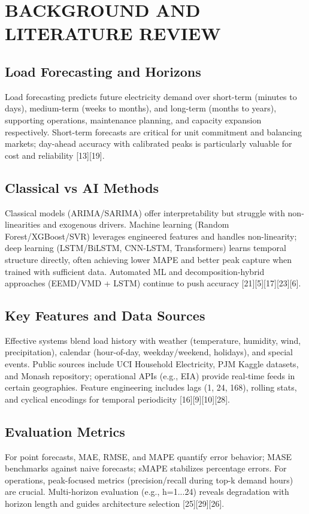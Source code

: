 \documentclass[12pt,a4paper]{report}
\begin{document}
\chapter{BACKGROUND AND LITERATURE REVIEW}

\section{Load Forecasting and Horizons}
Load forecasting predicts future electricity demand over short-term (minutes to days), medium-term (weeks to months), and long-term (months to years), supporting operations, maintenance planning, and capacity expansion respectively. Short-term forecasts are critical for unit commitment and balancing markets; day-ahead accuracy with calibrated peaks is particularly valuable for cost and reliability [13][19].

\section{Classical vs AI Methods}
Classical models (ARIMA/SARIMA) offer interpretability but struggle with non-linearities and exogenous drivers. Machine learning (Random Forest/XGBoost/SVR) leverages engineered features and handles non-linearity; deep learning (LSTM/BiLSTM, CNN-LSTM, Transformers) learns temporal structure directly, often achieving lower MAPE and better peak capture when trained with sufficient data. Automated ML and decomposition-hybrid approaches (EEMD/VMD + LSTM) continue to push accuracy [21][5][17][23][6].

\section{Key Features and Data Sources}
Effective systems blend load history with weather (temperature, humidity, wind, precipitation), calendar (hour-of-day, weekday/weekend, holidays), and special events. Public sources include UCI Household Electricity, PJM Kaggle datasets, and Monash repository; operational APIs (e.g., EIA) provide real-time feeds in certain geographies. Feature engineering includes lags (1, 24, 168), rolling stats, and cyclical encodings for temporal periodicity [16][9][10][28].

\section{Evaluation Metrics}
For point forecasts, MAE, RMSE, and MAPE quantify error behavior; MASE benchmarks against naive forecasts; sMAPE stabilizes percentage errors. For operations, peak-focused metrics (precision/recall during top-k demand hours) are crucial. Multi-horizon evaluation (e.g., h=1...24) reveals degradation with horizon length and guides architecture selection [25][29][26].
\end{document}
